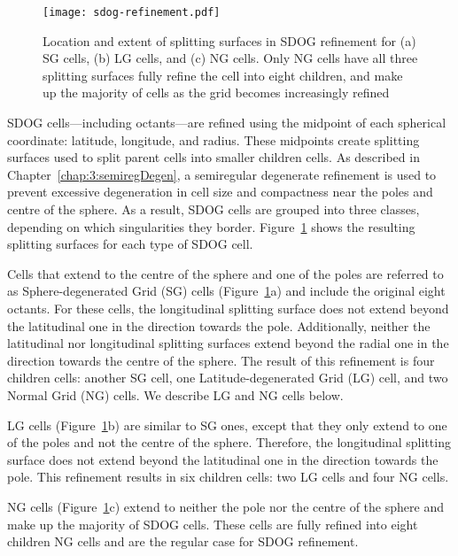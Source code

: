 \begin{figure}[ht!]
	\centering
	\texttt{[image: sdog-refinement.pdf]}
	\caption[Splitting surfaces used in SDOG refinement]{
		Location and extent of splitting surfaces in SDOG refinement for (a) SG cells, (b) LG cells, and (c) NG cells.
		Only NG cells have all three splitting surfaces fully refine the cell into eight children, and make up the majority of cells as the grid becomes increasingly refined
	}
	\label{fig:sdog-refinement}
\end{figure}


SDOG cells---including octants---are refined using the midpoint of each spherical coordinate: latitude, longitude, and radius.
These midpoints create splitting surfaces used to split parent cells into smaller children cells.
As described in Chapter~\ref{chap:3:semiregDegen}, a semiregular degenerate refinement is used to prevent excessive degeneration in cell size and compactness near the poles and centre of the sphere.
As a result, SDOG cells are grouped into three classes, depending on which singularities they border.
Figure~\ref{fig:sdog-refinement} shows the resulting splitting surfaces for each type of SDOG cell.


Cells that extend to the centre of the sphere and one of the poles are referred to as Sphere-degenerated Grid (SG) cells (Figure~\ref{fig:sdog-refinement}a) and include the original eight octants.
For these cells, the longitudinal splitting surface does not extend beyond the latitudinal one in the direction towards the pole.
Additionally, neither the latitudinal nor longitudinal splitting surfaces extend beyond the radial one in the direction towards the centre of the sphere.
The result of this refinement is four children cells: another SG cell, one Latitude-degenerated Grid (LG) cell, and two Normal Grid (NG) cells.
We describe LG and NG cells below.


LG cells (Figure~\ref{fig:sdog-refinement}b) are similar to SG ones, except that they only extend to one of the poles and not the centre of the sphere.
Therefore, the longitudinal splitting surface does not extend beyond the latitudinal one in the direction towards the pole.
This refinement results in six children cells: two LG cells and four NG cells.


NG cells (Figure~\ref{fig:sdog-refinement}c) extend to neither the pole nor the centre of the sphere and make up the majority of SDOG cells.
These cells are fully refined into eight children NG cells and are the regular case for SDOG refinement.


